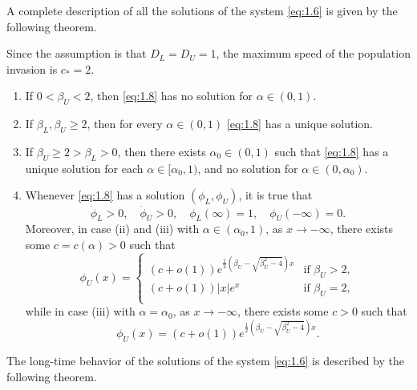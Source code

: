 A complete description of all the solutions of the system \eqref{eq:1.6} is given by the following theorem.

\begin{theorem}
    Since the assumption is that \(D_L = D_U = 1\), the maximum speed of the population invasion is \(c_* = 2\). 
    \begin{enumerate}[label=(\roman*)]
        \item If \(0 < \beta_U < 2\), then \eqref{eq:1.8} has no solution for \(\alpha \in (0, 1)\). 
        \item If \(\beta_L, \beta_U \geq 2\), then for every \(\alpha \in (0, 1)\) \eqref{eq:1.8} has a unique solution.
        \item If \(\beta_U \geq 2 > \beta_L > 0\), then there exists \(\alpha_0 \in (0, 1)\) such that \eqref{eq:1.8} has a unique solution for each \(\alpha \in [\alpha_0, 1)\), and no solution for \(\alpha \in (0, \alpha_0)\).
        \item  Whenever \eqref{eq:1.8} has a solution \((\phi_L, \phi_U)\), it is true that 
        \[
            \dot{\phi}_L > 0, \quad \dot{\phi}_U > 0, \quad \phi_L(\infty) = 1, \quad \phi_U(-\infty) = 0.
        \]
        Moreover, in case (ii) and (iii) with \(\alpha \in (\alpha_0, 1)\), as \(x \to -\infty\), there exists some \(c = c(\alpha) > 0\) such that
        \begin{equation}
            \phi_U(x) = \begin{cases}
                (c + o(1))e^{\frac{1}{2}(\beta_U - \sqrt{\beta_U^2 - 4})x} & \text{if } \beta_U > 2, \\
                (c + o(1))\lvert x\rvert e^{x} & \text{if } \beta_U = 2, \\
            \end{cases} 
            \label{eq:1.9}
        \end{equation}
        while in case (iii) with \(\alpha = \alpha_0\), as \(x \to -\infty\), there exists some \(c > 0\) such that
        \begin{equation}
            \phi_U(x) = (c + o(1))e^{\frac{1}{2}(\beta_U - \sqrt{\beta_U^2 - 4})x}.
            \label{eq:1.10}
        \end{equation}
    \end{enumerate}
    \label{thm:1.1}
\end{theorem}
The long-time behavior of the solutions of the system \eqref{eq:1.6} is described by the following theorem.
